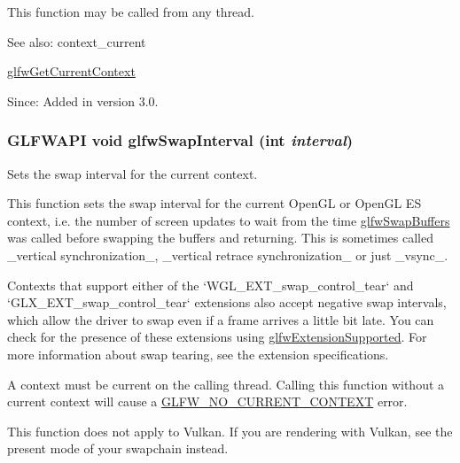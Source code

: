 This function may be called from any thread.

\begin{Desc}
\item[See also:]context\_\-current 

\hyperlink{group__context_gc28d98c655377d81a516bf5ef90780c8}{glfwGetCurrentContext}\end{Desc}
\begin{Desc}
\item[Since:]Added in version 3.0. \end{Desc}
\hypertarget{group__context_g12a595c06947cec4967c6e1f14210a8a}{
\subsubsection[glfwSwapInterval]{\setlength{\rightskip}{0pt plus 5cm}GLFWAPI void glfwSwapInterval (int {\em interval})}}
\label{group__context_g12a595c06947cec4967c6e1f14210a8a}


Sets the swap interval for the current context. 

This function sets the swap interval for the current OpenGL or OpenGL ES context, i.e. the number of screen updates to wait from the time \hyperlink{group__window_gfb827800eedbfcbc97b1e5408df668d7}{glfwSwapBuffers} was called before swapping the buffers and returning. This is sometimes called \_\-vertical synchronization\_\-, \_\-vertical retrace synchronization\_\- or just \_\-vsync\_\-.

Contexts that support either of the `WGL\_\-EXT\_\-swap\_\-control\_\-tear` and `GLX\_\-EXT\_\-swap\_\-control\_\-tear` extensions also accept negative swap intervals, which allow the driver to swap even if a frame arrives a little bit late. You can check for the presence of these extensions using \hyperlink{group__context_g9a28c712d35f9e43534e1d03b051c04c}{glfwExtensionSupported}. For more information about swap tearing, see the extension specifications.

A context must be current on the calling thread. Calling this function without a current context will cause a \hyperlink{group__errors_ga8290386e9528ccb9e42a3a4e16fc0d0}{GLFW\_\-NO\_\-CURRENT\_\-CONTEXT} error.

This function does not apply to Vulkan. If you are rendering with Vulkan, see the present mode of your swapchain instead.

